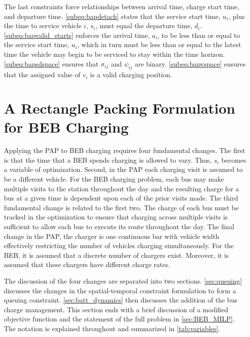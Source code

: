\documentclass[utf8]{FrontiersinHarvard}
\begin{document}
The last constraints force relationships between arrival time, charge start time, and departure time.
\autoref{subeq:bapdetach} states that the service start time, \(u_i\), plus the time to service vehicle \(i\), \(s_i\), must
equal the departure time, \(d_i\). \autoref{subeq:bapvalid_starts} enforces the arrival time, \(a_i\), to be less than or
equal to the service start time, \(u_i\), which in turn must be less than or equal to the latest time the vehicle may
begin to be serviced to stay within the time horizon. \autoref{subeq:bapsdspace} ensures that \(\sigma_{ij}\) and
\(\psi_{ij}\) are binary. \autoref{subeq:bapvspace} ensures that the assigned value of \(v_i\) is a valid charging position.
\section{A Rectangle Packing Formulation for BEB Charging}
\label{sec:problemformulation}
Applying the PAP to BEB charging requires four fundamental changes. The first is that the time that a BEB spends
charging is allowed to vary. Thus, \(s_i\) becomes a variable of optimization. Second, in the PAP each charging visit is
assumed to be a different vehicle. For the BEB charging problem, each bus may make multiple visits to the station
throughout the day and the resulting charge for a bus at a given time is dependent upon each of the prior visits made.
The third fundamental change is related to the first two. The charge of each bus must be tracked in
the optimization to ensure that charging across multiple visits is sufficient to allow each bus to execute its route throughout the day.
The final change in the PAP, the charger is one continuous bar with vehicle width effectively restricting the number of vehicles
charging simultaneously. For the BEB, it is assumed that a discrete number of chargers exist. Moreover, it is assumed
that these chargers have different charge rates.

The discussion of the four changes are separated into two sections. \autoref{sec:queuing} discusses the changes in the
spatial-temporal constraint formulation to form a queuing constraint. \autoref{sec:batt_dynamics} then discusses the
addition of the bus charge management. This section ends with a brief discussion of a modified objective function and
the statement of the full problem in \autoref{sec:BEB_MILP}. The notation is explained throughout and summarized in
\autoref{tab:variables}.
\end{document}
